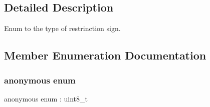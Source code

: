 \subsection{Detailed Description}
Enum to the type of restrinction sign. 

\subsection{Member Enumeration Documentation}
\mbox{\label{structmaf__perception__interface_1_1RestrictionSignTypeEnum_acebc99cec66e05eb2514d664f66e782d}} 
\subsubsection{\texorpdfstring{anonymous enum}{anonymous enum}}
{\footnotesize\ttfamily anonymous enum \+: uint8\+\_\+t}

